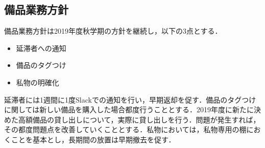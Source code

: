 \subsection*{備品業務方針}
備品業務方針は2019年度秋学期の方針を継続し，以下の3点とする．
\begin{itemize}
    \item 延滞者への通知
    \item 備品のタグつけ
    \item 私物の明確化
\end{itemize}
延滞者には1週間に1度Slackでの通知を行い，早期返却を促す．備品のタグつけに関しては新しい備品を購入した場合都度行うこととする．2019年度に新たに決めた高額備品の貸し出しについて，実際に貸し出しを行う．問題が発生すれば，その都度問題点を改善していくこととする．私物においては，私物専用の棚におくことを基本とし，長期間の放置は早期撤去を促す．

